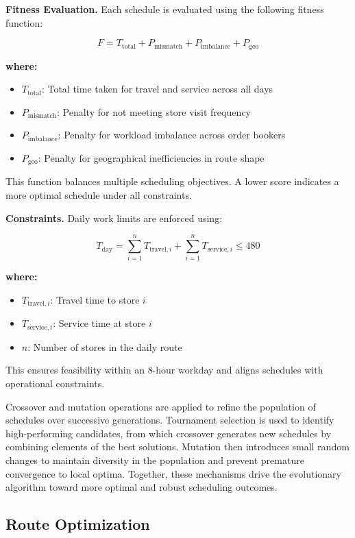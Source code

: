 \textbf{Fitness Evaluation.} Each schedule is evaluated using the following fitness function:

\[
F = T_{\text{total}} + P_{\text{mismatch}} + P_{\text{imbalance}} + P_{\text{geo}}
\]

\textbf{where:}
\begin{itemize}
  \item $T_{\text{total}}$: Total time taken for travel and service across all days
  \item $P_{\text{mismatch}}$: Penalty for not meeting store visit frequency
  \item $P_{\text{imbalance}}$: Penalty for workload imbalance across order bookers
  \item $P_{\text{geo}}$: Penalty for geographical inefficiencies in route shape
\end{itemize}
This function balances multiple scheduling objectives. A lower score indicates a more optimal schedule under all constraints.

\textbf{Constraints.} Daily work limits are enforced using:

\[
T_{\text{day}} = \sum_{i=1}^{n} T_{\text{travel},i} + \sum_{i=1}^{n} T_{\text{service},i} \leq 480
\]

\textbf{where:}
\begin{itemize}
  \item $T_{\text{travel},i}$: Travel time to store $i$
  \item $T_{\text{service},i}$: Service time at store $i$
  \item $n$: Number of stores in the daily route
\end{itemize}
This ensures feasibility within an 8-hour workday and aligns schedules with operational constraints.

Crossover and mutation operations are applied to refine the population of schedules over successive generations. Tournament selection is used to identify high-performing candidates, from which crossover generates new schedules by combining elements of the best solutions. Mutation then introduces small random changes to maintain diversity in the population and prevent premature convergence to local optima. Together, these mechanisms drive the evolutionary algorithm toward more optimal and robust scheduling outcomes.

\subsection{Route Optimization}

